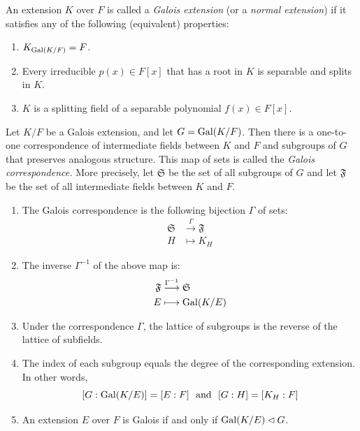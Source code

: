 \begin{definition}
    An extension $K$ over $F$ is called a \emph{Galois extension} (or a \emph{normal extension}) if it satisfies any of the following (equivalent) properties:
\begin{enumerate}
  \item $K_{\operatorname{Gal}(K/F)} = F$.
  \item Every irreducible $p(x)\in F[x]$ that has a root in $K$ is separable and splits in $K$.
  \item $K$ is a splitting field of a separable polynomial $f(x) \in F[x]$.
\end{enumerate}
\end{definition}
\begin{theorem}
    Let $K/F$ be a Galois extension, and let $G = \operatorname{Gal}(K/F)$.  Then there is a one-to-one correspondence of intermediate fields between $K$ and $F$ and subgroups of $G$ that preserves analogous structure.  This map of sets is called the \emph{Galois correspondence.} More precisely, let $\mathfrak{S}$ be the set of all subgroups of $G$ and let $\mathfrak{F}$ be the set of all intermediate fields between $K$ and $F$.
\begin{enumerate}
  \item The Galois correspondence is the following bijection $\Gamma$ of sets:
      \begin{align*}
          \mathfrak{S} &\stackrel{\Gamma}\longrightarrow \mathfrak{F} \\ H &\longmapsto K_H
      \end{align*}
  \item The inverse $\Gamma^{-1}$ of the above map is:
      \begin{align*} \mathfrak{F} &\stackrel{\Gamma^{-1}}\longrightarrow \mathfrak{S} \\ E &\longmapsto \operatorname{Gal}(K/E)
      \end{align*}
  \item Under the correspondence $\Gamma$, the lattice of subgroups is the reverse of the lattice of subfields.
  \item The index of each subgroup equals the degree of the corresponding extension.  In other words,
      $$[G:\operatorname{Gal}(K/E)] = [E:F] \,\,\mbox{ and }\,\, [G:H] = [K_H:F]$$
  \item An extension $E$ over $F$ is Galois if and only if $\operatorname{Gal}(K/E) \lhd G$.
\end{enumerate}
    \label{thm:galcorr}
\end{theorem}


